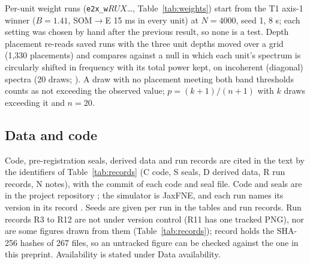 Per-unit weight runs (\texttt{e2x\_w}$RUX$\ldots, Table~\ref{tab:weights}) start from the T1 axis-1 winner ($B = 1.41$, SOM$\to$E 15 ms in every unit) at
$N = 4000$, seed 1, 8 s; each setting was chosen by hand after the previous result, so none is a test. Depth
placement re-reads saved runs with the three unit depths moved over a grid (1,330 placements) and compares against a
null in which each unit's spectrum is circularly shifted in frequency with its total power kept, on incoherent (diagonal) spectra (20 draws;
). A draw with no placement meeting both band thresholds counts as not exceeding the observed value; $p = (k+1)/(n+1)$ with $k$ draws exceeding it and $n = 20$.

\subsection{Data and code}

Code, pre-registration seals, derived data and run records are cited in the text by the identifiers of
Table~\ref{tab:records} (C code, S seals, D derived data, R run records, N notes), with the commit of each code
and seal file. Code and seals are in the project repository \citep{Jomission}; the simulator is JaxFNE, and each run names its version in its record
\citep{JaxFNE}. Seeds are given per run in the tables and run records. Run records R3 to R12 are not under version
control (R11 has one tracked PNG), nor are some figures drawn from them (Table~\ref{tab:records}); record  holds the SHA-256 hashes
of 267 files, so an untracked figure can be checked against the one in this
preprint. Availability is stated under Data availability.
